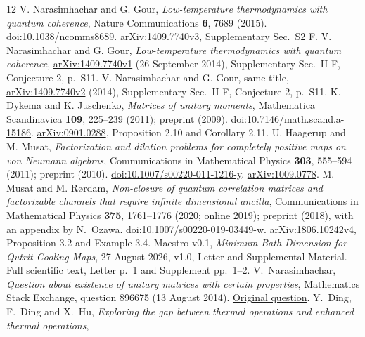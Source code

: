 \documentclass[11pt]{article}
\begin{document}
\begin{thebibliography}{12}
 V. Narasimhachar and G. Gour,
\emph{Low-temperature thermodynamics with quantum coherence},
Nature Communications \textbf{6}, 7689 (2015).
\href{https://doi.org/10.1038/ncomms8689}{doi:10.1038/ncomms8689}.
\href{https://arxiv.org/abs/1409.7740v3}{arXiv:1409.7740v3}, Supplementary Sec.\ S2 F.
 V. Narasimhachar and G. Gour,
\emph{Low-temperature thermodynamics with quantum coherence},
\href{https://arxiv.org/abs/1409.7740v1}{arXiv:1409.7740v1}
(26 September 2014), Supplementary Sec.\ II F, Conjecture 2, p.\ S11.
 V. Narasimhachar and G. Gour, same title,
\href{https://arxiv.org/abs/1409.7740v2}{arXiv:1409.7740v2}
(2014), Supplementary Sec.\ II F, Conjecture 2, p.\ S11.
 K. Dykema and K. Juschenko,
\emph{Matrices of unitary moments}, Mathematica Scandinavica \textbf{109},
225--239 (2011); preprint (2009).
\href{https://doi.org/10.7146/math.scand.a-15186}{doi:10.7146/math.scand.a-15186}.
\href{https://arxiv.org/abs/0901.0288}{arXiv:0901.0288}, Proposition 2.10 and Corollary 2.11.
 U. Haagerup and M. Musat,
\emph{Factorization and dilation problems for completely positive maps on
von Neumann algebras}, Communications in Mathematical Physics
\textbf{303}, 555--594 (2011); preprint (2010).
\href{https://doi.org/10.1007/s00220-011-1216-y}{doi:10.1007/s00220-011-1216-y}.
\href{https://arxiv.org/abs/1009.0778}{arXiv:1009.0778}.
 M. Musat and M. R\o rdam,
\emph{Non-closure of quantum correlation matrices and factorizable channels
that require infinite dimensional ancilla}, Communications in Mathematical
Physics \textbf{375}, 1761--1776 (2020; online 2019); preprint (2018),
with an appendix by N.\ Ozawa.
\href{https://doi.org/10.1007/s00220-019-03449-w}{doi:10.1007/s00220-019-03449-w}.
\href{https://arxiv.org/abs/1806.10242v4}{arXiv:1806.10242v4},
Proposition 3.2 and Example 3.4.
 Maestro v0.1, \emph{Minimum Bath Dimension for Qutrit Cooling Maps},
27 August 2026, v1.0, Letter and Supplemental Material.
\href{https://pudimphysics.org/research/RO-2026-0004/releases/v1.0/combined.pdf?download=1}{Full scientific text},
Letter p.\ 1 and Supplement pp.\ 1--2.
 V.\ Narasimhachar,
\emph{Question about existence of unitary matrices with certain properties},
Mathematics Stack Exchange, question 896675 (13 August 2014).
\href{https://math.stackexchange.com/questions/896675/question-about-existence-of-unitary-matrices-with-certain-properties}{Original question}.
 Y.\ Ding, F.\ Ding and X.\ Hu,
\emph{Exploring the gap between thermal operations and enhanced thermal operations},

\end{thebibliography}
\end{document}
